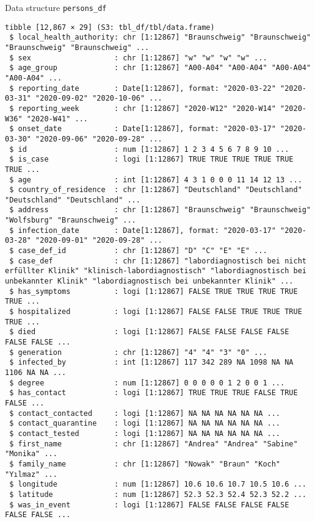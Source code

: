 \documentclass[
  8pt,
  ignorenonframetext,
]{beamer}
\begin{document}
\begin{frame}[fragile]{Data structure}
\protect\hypertarget{data-structure}{}
\texttt{persons\_df}

\vspace{0.2cm}

\tiny

\begin{verbatim}
tibble [12,867 × 29] (S3: tbl_df/tbl/data.frame)
 $ local_health_authority: chr [1:12867] "Braunschweig" "Braunschweig" "Braunschweig" "Braunschweig" ...
 $ sex                   : chr [1:12867] "w" "w" "w" "w" ...
 $ age_group             : chr [1:12867] "A00-A04" "A00-A04" "A00-A04" "A00-A04" ...
 $ reporting_date        : Date[1:12867], format: "2020-03-22" "2020-03-31" "2020-09-02" "2020-10-06" ...
 $ reporting_week        : chr [1:12867] "2020-W12" "2020-W14" "2020-W36" "2020-W41" ...
 $ onset_date            : Date[1:12867], format: "2020-03-17" "2020-03-30" "2020-09-06" "2020-09-28" ...
 $ id                    : num [1:12867] 1 2 3 4 5 6 7 8 9 10 ...
 $ is_case               : logi [1:12867] TRUE TRUE TRUE TRUE TRUE TRUE ...
 $ age                   : int [1:12867] 4 3 1 0 0 0 11 14 12 13 ...
 $ country_of_residence  : chr [1:12867] "Deutschland" "Deutschland" "Deutschland" "Deutschland" ...
 $ address               : chr [1:12867] "Braunschweig" "Braunschweig" "Wolfsburg" "Braunschweig" ...
 $ infection_date        : Date[1:12867], format: "2020-03-17" "2020-03-28" "2020-09-01" "2020-09-28" ...
 $ case_def_id           : chr [1:12867] "D" "C" "E" "E" ...
 $ case_def              : chr [1:12867] "labordiagnostisch bei nicht erfüllter Klinik" "klinisch-labordiagnostisch" "labordiagnostisch bei unbekannter Klinik" "labordiagnostisch bei unbekannter Klinik" ...
 $ has_symptoms          : logi [1:12867] FALSE TRUE TRUE TRUE TRUE TRUE ...
 $ hospitalized          : logi [1:12867] FALSE FALSE TRUE TRUE TRUE TRUE ...
 $ died                  : logi [1:12867] FALSE FALSE FALSE FALSE FALSE FALSE ...
 $ generation            : chr [1:12867] "4" "4" "3" "0" ...
 $ infected_by           : int [1:12867] 117 342 289 NA 1098 NA NA 1106 NA NA ...
 $ degree                : num [1:12867] 0 0 0 0 0 1 2 0 0 1 ...
 $ has_contact           : logi [1:12867] TRUE TRUE TRUE FALSE TRUE FALSE ...
 $ contact_contacted     : logi [1:12867] NA NA NA NA NA NA ...
 $ contact_quarantine    : logi [1:12867] NA NA NA NA NA NA ...
 $ contact_tested        : logi [1:12867] NA NA NA NA NA NA ...
 $ first_name            : chr [1:12867] "Andrea" "Andrea" "Sabine" "Monika" ...
 $ family_name           : chr [1:12867] "Nowak" "Braun" "Koch" "Yılmaz" ...
 $ longitude             : num [1:12867] 10.6 10.6 10.7 10.5 10.6 ...
 $ latitude              : num [1:12867] 52.3 52.3 52.4 52.3 52.2 ...
 $ was_in_event          : logi [1:12867] FALSE FALSE FALSE FALSE FALSE FALSE ...
\end{verbatim}

\normalsize
\end{frame}
\end{document}
